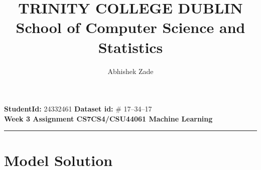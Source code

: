 \documentclass[a4paper,10pt]{article}
\begin{document}
\vspace{-2cm}
\title{\LARGE \textbf{TRINITY COLLEGE DUBLIN} \\ %
\large School of Computer Science and Statistics}
\author{Abhishek Zade}
\date{} %
\maketitle
\vspace{-1cm} %

\noindent
\textbf{StudentId:} 24332461 \hfill \textbf{Dataset id:} \# 17--34--17 \\
\textbf{Week 3 Assignment \hfill CS7CS4/CSU44061 Machine Learning} \\

\noindent\rule{\textwidth}{0.4pt} %

\section*{Model Solution}
\end{document}
